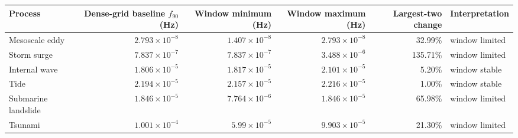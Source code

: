 \begin{tabular}{lrrrrl}
\toprule
Process & Dense-grid baseline $f_{90}$ (Hz) & Window minimum (Hz) & Window maximum (Hz) & Largest-two change & Interpretation \\
\midrule
Mesoscale eddy & $2.793\times10^{-8}$ & $1.407\times10^{-8}$ & $2.793\times10^{-8}$ & 32.99\% & window limited \\
Storm surge & $7.837\times10^{-7}$ & $7.837\times10^{-7}$ & $3.488\times10^{-6}$ & 135.71\% & window limited \\
Internal wave & $1.806\times10^{-5}$ & $1.817\times10^{-5}$ & $2.101\times10^{-5}$ & 5.20\% & window stable \\
Tide & $2.194\times10^{-5}$ & $2.157\times10^{-5}$ & $2.216\times10^{-5}$ & 1.00\% & window stable \\
Submarine landslide & $1.846\times10^{-5}$ & $7.764\times10^{-6}$ & $1.846\times10^{-5}$ & 65.98\% & window limited \\
Tsunami & $1.001\times10^{-4}$ & $5.99\times10^{-5}$ & $9.903\times10^{-5}$ & 21.30\% & window limited \\
\bottomrule
\end{tabular}
